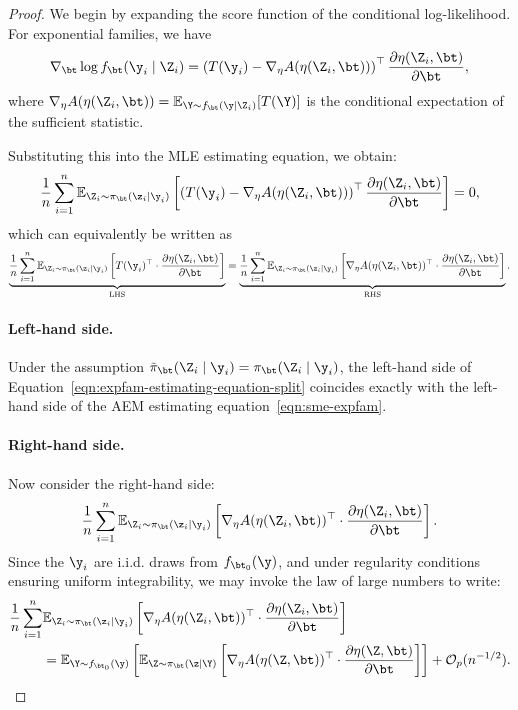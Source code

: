 \begin{proof}
We begin by expanding the score function of the conditional log-likelihood. For exponential families, we have
\[
\nabla_\bt \log f_\bt(\y_i \mid \Z_i)
= \left( T(\y_i) - \nabla_\eta A(\eta(\Z_i, \bt)) \right)^\top 
\frac{\partial \eta(\Z_i, \bt)}{\partial \bt},
\]
where \( \nabla_\eta A(\eta(\Z_i, \bt)) = \mathbb{E}_{\Y \sim f_\bt(\y \mid \Z_i)}[T(\Y)] \) is the conditional expectation of the sufficient statistic.

Substituting this into the MLE estimating equation, we obtain:
\begin{equation}
\label{eqn:expfam-estimating-equation}
\frac{1}{n} \sum_{i=1}^n 
\mathbb{E}_{\Z_i \sim \pi_\bt(\z_i \mid \y_i)} 
\left[
\left( T(\y_i) - \nabla_\eta A(\eta(\Z_i, \bt)) \right)^\top 
\frac{\partial \eta(\Z_i, \bt)}{\partial \bt}
\right]
= 0,
\end{equation}
which can equivalently be written as
\begin{equation}
\label{eqn:expfam-estimating-equation-split}
\underbrace{
\frac{1}{n} \sum_{i=1}^n 
\mathbb{E}_{\Z_i \sim \pi_\bt(\z_i \mid \y_i)} 
\left[
T(\y_i)^\top \cdot \frac{\partial \eta(\Z_i, \bt)}{\partial \bt}
\right]
}_{\text{LHS}}
=
\underbrace{
\frac{1}{n} \sum_{i=1}^n 
\mathbb{E}_{\Z_i \sim \pi_\bt(\z_i \mid \y_i)} 
\left[
\nabla_\eta A(\eta(\Z_i, \bt))^\top \cdot \frac{\partial \eta(\Z_i, \bt)}{\partial \bt}
\right]
}_{\text{RHS}}.
\end{equation}

\paragraph{Left-hand side.} Under the assumption \( \tilde \pi_\bt(\Z_i \mid \y_i) = \pi_\bt(\Z_i \mid \y_i) \), the left-hand side of Equation~\eqref{eqn:expfam-estimating-equation-split} coincides exactly with the left-hand side of the AEM estimating equation~\eqref{eqn:sme-expfam}.

\paragraph{Right-hand side.} Now consider the right-hand side:
\[
\frac{1}{n} \sum_{i=1}^n 
\mathbb{E}_{\Z_i\sim \pi_\bt(\z_i \mid \y_i)} 
\left[
\nabla_\eta A(\eta(\Z_i, \bt))^\top 
\cdot 
\frac{\partial \eta(\Z_i, \bt)}{\partial \bt}
\right].
\]
Since the \( \y_i \) are i.i.d. draws from \( f_{\bt_0}(\y) \), and under regularity conditions ensuring uniform integrability, we may invoke the law of large numbers to write:
\begin{align*}
\frac{1}{n} \sum_{i=1}^n 
&\mathbb{E}_{\Z_i \sim \pi_\bt(\z_i \mid \y_i)} 
\left[
\nabla_\eta A(\eta(\Z_i, \bt))^\top 
\cdot 
\frac{\partial \eta(\Z_i, \bt)}{\partial \bt}
\right] \\
&= \mathbb{E}_{\Y \sim f_{\bt_0}(\y)} 
\left[
\mathbb{E}_{\Z\sim \pi_\bt(\z \mid \Y)} 
\left[
\nabla_\eta A(\eta(\Z, \bt))^\top 
\cdot 
\frac{\partial \eta(\Z, \bt)}{\partial \bt}
\right]
\right]
+ \mathcal{O}_p(n^{-1/2}).
\end{align*}


\end{proof}
